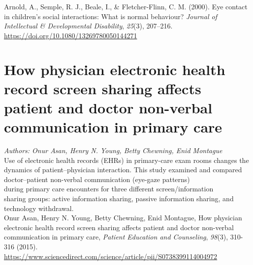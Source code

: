 \documentclass[12pt]{article}
\begin{document}
\noindent Arnold, A., Semple, R. J., Beale, I., \& Fletcher-Flinn, C. M. (2000). Eye contact in children’s social interactions: What is normal behaviour? \textit{Journal of Intellectual \& Developmental Disability}, \textit{25}(3), 207–216. \\\href{https://doi.org/10.1080/13269780050144271}{https://doi.org/10.1080/13269780050144271}

\section{How physician electronic health record screen sharing affects patient and doctor non-verbal communication in primary care}

\noindent\textit{Authors: Onur Asan, Henry N. Young, Betty Chewning, Enid Montague}\\

\noindent Use of electronic health records (EHRs) in primary-care exam rooms changes the dynamics of patient–physician interaction. This study examined and compared doctor–patient non-verbal communication (eye-gaze patterns)\\during primary care encounters for three different screen/information\\sharing groups: active information sharing, passive information sharing, and technology withdrawal.\\

\noindent Onur Asan, Henry N. Young, Betty Chewning, Enid Montague, How physician electronic health record screen sharing affects patient and doctor non-verbal communication in primary care, \textit{Patient Education and Counseling}, \textit{98}(3), 310-316 (2015). 
\\\href{https://doi.org/10.1016/j.pec.2014.11.024}{https://www.sciencedirect.com/science/article/pii/S0738399114004972}
\end{document}

